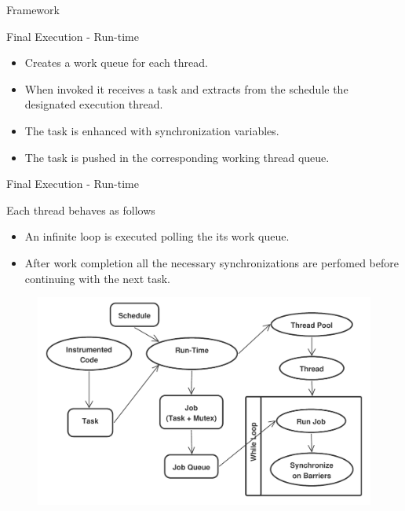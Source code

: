 \documentclass[xcolor=dvipsnames]{beamer}
\begin{document}
\begin{section}{Framework}
\begin{frame}{\hskip 0.3cm Final Execution - Run-time }
\begin{itemize}
\item Creates a work queue for each thread.

\item When invoked it receives a task and extracts from the schedule the designated execution thread.

\item The task is enhanced with synchronization variables.

\item The task is pushed in the corresponding working  thread queue.

\end{itemize}

\end{frame}












\begin{frame}{\hskip 0.3cm Final Execution - Run-time}

Each thread behaves as follows

\begin{itemize}

\item An infinite loop is executed polling the its work queue.

\item After work completion all the necessary synchronizations are perfomed before continuing with the next task.

\end{itemize}

\begin{figure}
\centering
\includegraphics[scale=0.40]{runtime_execution.pdf}
\end{figure}




\end{frame}











\end{section}
\end{document}
